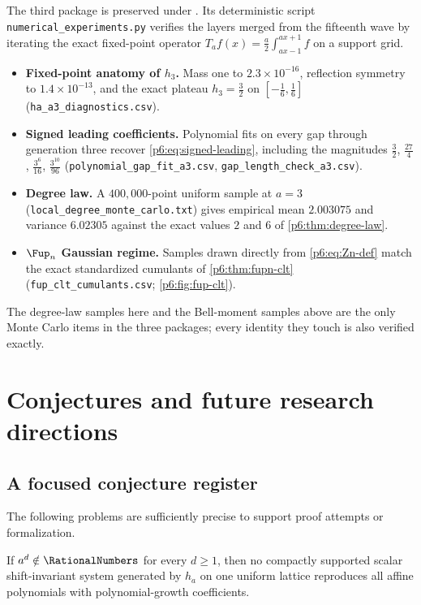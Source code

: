 \documentclass[11pt,oneside]{article}
\numberwithin{equation}{section}
\theoremstyle{definition}
\theoremstyle{remark}
\begin{document}
The third package is preserved under
.  Its deterministic script
\texttt{numerical\_experiments.py} verifies the layers merged from the
fifteenth wave by iterating the exact fixed-point operator
$T_af(x)=\tfrac a2\int_{ax-1}^{ax+1}f$ on a support grid.
\begin{itemize}
\item \textbf{Fixed-point anatomy of $h_3$.}  Mass one to
$2.3\times10^{-16}$, reflection symmetry to $1.4\times10^{-13}$, and the
exact plateau $h_3=\tfrac32$ on $[-\tfrac16,\tfrac16]$
(\texttt{ha\_a3\_diagnostics.csv}).
\item \textbf{Signed leading coefficients.}  Polynomial fits on every gap
through generation three recover \eqref{p6:eq:signed-leading}, including the
magnitudes $\tfrac32$, $\tfrac{27}4$, $\tfrac{3^6}{16}$, $\tfrac{3^{10}}{96}$
(\texttt{polynomial\_gap\_fit\_a3.csv}, \texttt{gap\_length\_check\_a3.csv}).
\item \textbf{Degree law.}  A $400{,}000$-point uniform sample at $a=3$
(\texttt{local\_degree\_monte\_carlo.txt}) gives empirical mean $2.003075$
and variance $6.02305$ against the exact values $2$ and $6$ of
\cref{p6:thm:degree-law}.
\item \textbf{$\Fup_n$ Gaussian regime.}  Samples drawn directly from
\eqref{p6:eq:Zn-def} match the exact standardized cumulants of
\cref{p6:thm:fupn-clt} (\texttt{fup\_clt\_cumulants.csv};
\cref{p6:fig:fup-clt}).
\end{itemize}
The degree-law samples here and the Bell-moment samples above are the only
Monte Carlo items in the three packages; every identity they touch is also
verified exactly.

\section{Conjectures and future research directions}\label{p6:sec:future-directions}

\subsection{A focused conjecture register}

The following problems are sufficiently precise to support proof attempts or
formalization.

\begin{conjecture}
If $a^d\notin\RationalNumbers$ for every $d\ge1$, then no compactly supported scalar
shift-invariant system generated by $h_a$ on one uniform lattice reproduces all
affine polynomials with polynomial-growth coefficients.
\end{conjecture}
\end{document}
